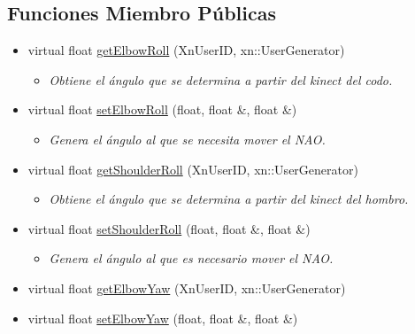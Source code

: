 \subsection*{\-Funciones \-Miembro \-Públicas}
\begin{itemize}
\item 
virtual float \hyperlink{class_l_arm_aca3aa8c68dedd1c7fb1e0ed9ba55b239}{get\-Elbow\-Roll} (\-Xn\-User\-I\-D, xn\-::\-User\-Generator)
\begin{itemize}\small\item\em \-Obtiene el ángulo que se determina a partir del kinect del codo. \end{itemize}\item 
\hypertarget{class_l_arm_a19580475d6f1d5ae421a419a090f835e}{virtual float \hyperlink{class_l_arm_a19580475d6f1d5ae421a419a090f835e}{set\-Elbow\-Roll} (float, float \&, float \&)}\label{class_l_arm_a19580475d6f1d5ae421a419a090f835e}

\begin{itemize}\small\item\em \-Genera el ángulo al que se necesita mover el \-N\-A\-O. \end{itemize}\item 
\hypertarget{class_l_arm_a25b46c7a95c135f5020800b78a28d24a}{virtual float \hyperlink{class_l_arm_a25b46c7a95c135f5020800b78a28d24a}{get\-Shoulder\-Roll} (\-Xn\-User\-I\-D, xn\-::\-User\-Generator)}\label{class_l_arm_a25b46c7a95c135f5020800b78a28d24a}

\begin{itemize}\small\item\em \-Obtiene el ángulo que se determina a partir del kinect del hombro. \end{itemize}\item 
\hypertarget{class_l_arm_ada7589a6dabadd906736f76e9d71d9c5}{virtual float \hyperlink{class_l_arm_ada7589a6dabadd906736f76e9d71d9c5}{set\-Shoulder\-Roll} (float, float \&, float \&)}\label{class_l_arm_ada7589a6dabadd906736f76e9d71d9c5}

\begin{itemize}\small\item\em \-Genera el ángulo al que es necesario mover el \-N\-A\-O. \end{itemize}\item 
virtual float \hyperlink{class_l_arm_a45c25b7614431e4a3e39bfcf977a3de7}{get\-Elbow\-Yaw} (\-Xn\-User\-I\-D, xn\-::\-User\-Generator)
\item 
\hypertarget{class_l_arm_a536c8e6957dfc9e2b8a9d3c0ee3b8f52}{virtual float \hyperlink{class_l_arm_a536c8e6957dfc9e2b8a9d3c0ee3b8f52}{set\-Elbow\-Yaw} (float, float \&, float \&)}\label{class_l_arm_a536c8e6957dfc9e2b8a9d3c0ee3b8f52}

\end{itemize}


